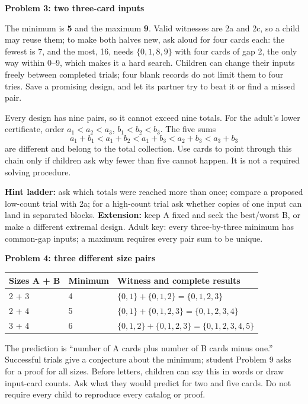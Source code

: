 \documentclass[11pt]{article}
\newcommand{\sub}[1]{\textbf{#1}\par}
\newcommand{\sset}[1]{\{#1\}}
\begin{document}
\sub{Problem 3: two three-card inputs}
The minimum is \textbf{5} and the maximum \textbf{9}. Valid witnesses are 2a and 2c, so a child may reuse them; to make both halves new, ask aloud for four cards each: the fewest is 7, and the most, 16, needs $\sset{0,1,8,9}$ with four cards of gap 2, the only way within 0--9, which makes it a hard search. Children can change their inputs freely between completed trials; four blank records do not limit them to four tries. Save a promising design, and let its partner try to beat it or find a missed pair.

Every design has nine pairs, so it cannot exceed nine totals. For the adult's lower certificate, order $a_1<a_2<a_3$, $b_1<b_2<b_3$. The five sums
\[
 a_1+b_1<a_1+b_2<a_1+b_3<a_2+b_3<a_3+b_3
\]
are different and belong to the total collection. Use cards to point through this chain only if children ask why fewer than five cannot happen. It is not a required solving procedure.

\textbf{Hint ladder:} ask which totals were reached more than once; compare a proposed low-count trial with 2a; for a high-count trial ask whether copies of one input can land in separated blocks. \textbf{Extension:} keep A fixed and seek the best/worst B, or make a different extremal design. Adult key: every three-by-three minimum has common-gap inputs; a maximum requires every pair sum to be unique.

\sub{Problem 4: three different size pairs}
\begin{tabularx}{\linewidth}{@{}p{22mm}p{20mm}X@{}}
\toprule
Sizes A + B & Minimum & Witness and complete results\\\midrule
2 + 3 & 4 & $\sset{0,1}+\sset{0,1,2}=\sset{0,1,2,3}$\\
2 + 4 & 5 & $\sset{0,1}+\sset{0,1,2,3}=\sset{0,1,2,3,4}$\\
3 + 4 & 6 & $\sset{0,1,2}+\sset{0,1,2,3}=\sset{0,1,2,3,4,5}$\\\bottomrule
\end{tabularx}
The prediction is ``number of A cards plus number of B cards minus one.'' Successful trials give a conjecture about the minimum; student Problem 9 asks for a proof for all sizes. Before letters, children can say this in words or draw input-card counts. Ask what they would predict for two and five cards. Do not require every child to reproduce every catalog or proof.
\newpage
\end{document}
